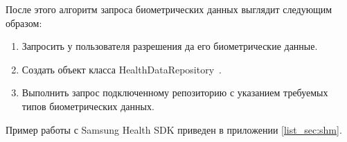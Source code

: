 После этого алгоритм запроса биометрических данных выглядит следующим образом:
\begin{enumerate}
	\item Запросить у пользователя разрешения да его биометрические данные.
	\item Создать объект класса HealthDataRepository~\autocite{shsdk_data_store}.
	\item Выполнить запрос подключенному репозиторию с указанием требуемых типов биометрических данных.
\end{enumerate}
\smallskip
Пример работы с Samsung Health SDK приведен в приложении \ref{list_sec:shm}.